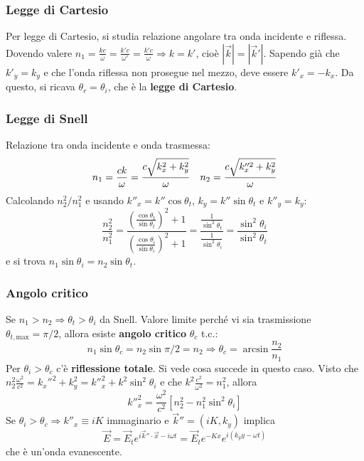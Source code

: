 \documentclass[a4paper]{scrartcl}
\numberwithin{equation}{subsection}
\theoremstyle{style1}
\begin{document}
\subsubsection{Legge di Cartesio}
Per legge di Cartesio, si studia relazione angolare tra onda incidente e riflessa. Dovendo valere $n_1=\frac{kc}{\omega} = \frac{k' c}{\omega'}= \frac{k' c}{\omega}\Rightarrow k = k'$, cio\`e $|\vec{k}| = |\vec{k}'|$. Sapendo gi\`a che $k'_y=k_y$ e che l'onda riflessa non prosegue nel mezzo, deve essere $k'_x = - k_x$. Da questo, si ricava $\theta _r = \theta _i$, che \`e la \textbf{legge di Cartesio}.
\subsubsection{Legge di Snell}

Relazione tra onda incidente e onda trasmessa:
\[
n_1 = \frac{ck}{\omega}=\frac{c \sqrt{k_x ^2 + k_y^2} }{\omega}\; \hspace{.25cm} n_2=\frac{c\sqrt{k''^2_x + k_y^2} }{\omega}
\] 
Calcolando $n^2_2 / n^2_1$ e usando $k''_x = k'' \cos \theta _t$, $k_y = k''\sin\theta _t$ e $k''_y = k_y$: 
\begin{equation}
	\frac{n_2^2}{n_1^2}=\frac{\left(\frac{\cos \theta _t}{\sin\theta  _t}\right) ^2 + 1 }{\left(\frac{\cos \theta _i}{\sin \theta _i}\right) ^2 + 1 } = \frac{\frac{1}{\sin^2 \theta _t}}{\frac{1}{\sin^2 \theta _i}}= \frac{\sin^2 \theta _i}{\sin^2\theta _t}
\end{equation}
e si trova $n_1\sin \theta _i = n_2 \sin \theta  _t$.
\subsubsection{Angolo critico}

Se $n_1 > n_2\Rightarrow \theta _t > \theta _i$ da Snell. Valore limite perch\'e vi sia trasmissione $\theta _{t, \text{max}} = \pi / 2 $, allora esiste \textbf{angolo critico} $\theta _c$ t.c.: 
\begin{equation}
	n_1\sin \theta _c = n_2 \sin \pi /2 = n_2 \Rightarrow \theta _c = \arcsin \frac{n_2}{n_1}
\end{equation}
Per $\theta _i > \theta _c$ c'\`e \textbf{riflessione totale}. Si vede cosa succede in questo caso. Visto che $n_2^2 \frac{\omega^2}{c^2} = k_x''^2 + k_y^2 = k''^2_x + k^2 \sin ^2 \theta _i$ e che $k^2 \frac{c^2}{\omega^2} = n_1^2$, allora
\begin{equation}
	k''^2_x = \frac{\omega^2}{c^2}\left[ n_2^2 - n_1^2 \sin^2 \theta _i  \right] 
\end{equation}
Se $\theta _i > \theta _c\Rightarrow k''_x \equiv iK$ immaginario e $\vec{k}'' = (iK,k_y)$ implica
\begin{equation}
	\vec{E}=\vec{E}_t e^{i \vec{k}'' \cdot \vec{x}- i\omega t}= \vec{E}_t e^{-Kx} e ^{i (k_y y - \omega t)}   
\end{equation}
che \`e un'onda evanescente.
\end{document}
